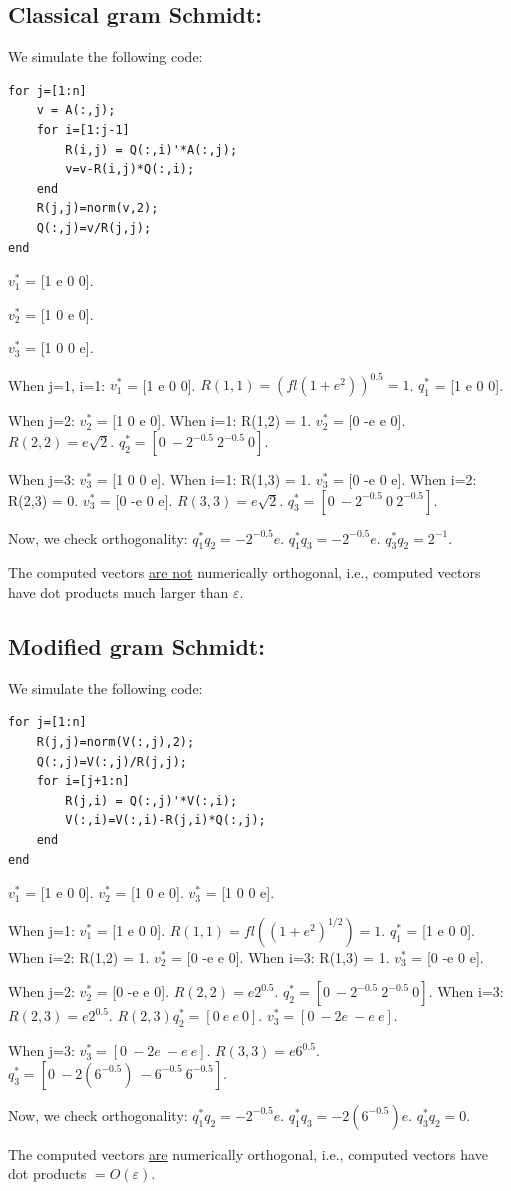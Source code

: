 \documentclass[10pt]{amsart}
\theoremstyle{remark}
\begin{document}
\subsection{Classical gram Schmidt:}
We simulate the following code:
\begin{verbatim}
for j=[1:n]
    v = A(:,j);
    for i=[1:j-1]
        R(i,j) = Q(:,i)'*A(:,j);
        v=v-R(i,j)*Q(:,i);
    end
    R(j,j)=norm(v,2);
    Q(:,j)=v/R(j,j);
end
\end{verbatim}
$v_{1}^{*}$ = [1 e 0 0].

$v_{2}^{*}$ = [1 0 e 0].

$v_{3}^{*}$ = [1 0 0 e].

When j=1, i=1:
$v_{1}^{*}$ = [1 e 0 0].
$R(1,1) = (fl(1 + e^{2}))^{0.5} = 1$.
$q_{1}^{*}$ = [1 e 0 0].

When j=2:
$v_{2}^{*}$ = [1 0 e 0].
When i=1:
R(1,2) = 1.
$v_{2}^{*}$ = [0 -e e 0].
$R(2,2) = e\sqrt{2}$.
$q_{2}^{*} = [0\ -2^{-0.5}\ 2^{-0.5}\ 0]$.

When j=3:
$v_{3}^{*}$ = [1 0 0 e].
When i=1:
R(1,3) = 1.
$v_{3}^{*}$ = [0 -e 0 e].
When i=2:
R(2,3) = 0.
$v_{3}^{*}$ = [0 -e 0 e].
$R(3,3) = e\sqrt{2}$.
$q_{3}^{*} = [0\ -2^{-0.5}\ 0\ 2^{-0.5}]$.

Now, we check orthogonality:
$q_{1}^{*}q_{2}= -2^{-0.5}e$.
$q_{1}^{*}q_{3}= -2^{-0.5}e$.
$q_{3}^{*}q_{2}= 2^{-1}$.

The computed vectors \underline{are not} numerically orthogonal, i.e., computed vectors have dot products much larger than $\varepsilon$.

\subsection{Modified gram Schmidt:}
We simulate the following code:
\begin{verbatim}
for j=[1:n]
    R(j,j)=norm(V(:,j),2);
    Q(:,j)=V(:,j)/R(j,j);
    for i=[j+1:n]
        R(j,i) = Q(:,j)'*V(:,i);
        V(:,i)=V(:,i)-R(j,i)*Q(:,j);
    end
end
\end{verbatim}
$v_{1}^{*}$ = [1 e 0 0].
$v_{2}^{*}$ = [1 0 e 0].
$v_{3}^{*}$ = [1 0 0 e].

When j=1:
$v_{1}^{*}$ = [1 e 0 0].
$R(1,1) = fl((1 + e^{2})^{1/2}) = 1$.
$q_{1}^{*}$ = [1 e 0 0].
When i=2:
R(1,2) = 1.
$v_{2}^{*}$ = [0 -e e 0].
When i=3:
R(1,3) = 1.
$v_{3}^{*}$ = [0 -e 0 e].

When j=2:
$v_{2}^{*}$ = [0 -e e 0].
$R(2,2) = e2^{0.5}$.
$q_{2}^{*} = [0\ -2^{-0.5}\ 2^{-0.5}\ 0]$.
When i=3:
$R(2,3) = e2^{0.5}$.
$R(2,3)q_{2}^{*} = [0\ e\ e\ 0]$.
$v_{3}^{*} = [0\ -2e\ -e\ e]$.

When j=3:
$v_{3}^{*} = [0\ -2e\ -e\ e]$.
$R(3,3) = e6^{0.5}$.
$q_{3}^{*} = [0\ -2(6^{-0.5})\ -6^{-0.5}\ 6^{-0.5}]$.


Now, we check orthogonality:
$q_{1}^{*}q_{2}= -2^{-0.5}e$.
$q_{1}^{*}q_{3}= -2(6^{-0.5})e$.
$q_{3}^{*}q_{2}= 0$.

The computed vectors \underline{are} numerically orthogonal, i.e., computed vectors have dot products $= O(\varepsilon)$.
% 
% 
\end{document}
